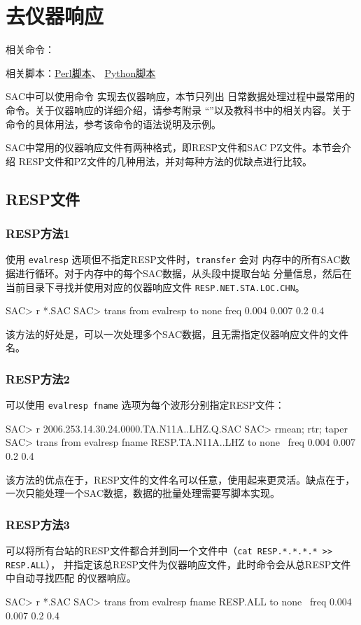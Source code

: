 \section{去仪器响应}
\label{sec:instrument-response}
相关命令：

相关脚本：\hyperref[subsec:transfer-perl]{Perl脚本}、
          \hyperref[subsec:transfer-python]{Python脚本}

SAC中可以使用命令  实现去仪器响应，本节只列出
日常数据处理过程中最常用的命令。关于仪器响应的详细介绍，请参考附录
``''以及教科书中的相关内容。关于 
命令的具体用法，参考该命令的语法说明及示例。

SAC中常用的仪器响应文件有两种格式，即RESP文件和SAC PZ文件。本节会介绍
RESP文件和PZ文件的几种用法，并对每种方法的优缺点进行比较。

\subsection{RESP文件}

\subsubsection{RESP方法1}
使用 \texttt{evalresp} 选项但不指定RESP文件时，\texttt{transfer} 会对
内存中的所有SAC数据进行循环。对于内存中的每个SAC数据，从头段中提取台站
分量信息，然后在当前目录下寻找并使用对应的仪器响应文件
\texttt{RESP.NET.STA.LOC.CHN}。
\begin{SACCode}
SAC> r *.SAC
SAC> trans from evalresp to none freq 0.004 0.007 0.2 0.4
\end{SACCode}
该方法的好处是，可以一次处理多个SAC数据，且无需指定仪器响应文件的文件名。

\subsubsection{RESP方法2}
可以使用 \texttt{evalresp fname} 选项为每个波形分别指定RESP文件：
\begin{SACCode}
SAC> r 2006.253.14.30.24.0000.TA.N11A..LHZ.Q.SAC
SAC> rmean; rtr; taper
SAC> trans from evalresp fname RESP.TA.N11A..LHZ to none \
                                freq 0.004 0.007 0.2 0.4
\end{SACCode}
该方法的优点在于，RESP文件的文件名可以任意，使用起来更灵活。缺点在于，
一次只能处理一个SAC数据，数据的批量处理需要写脚本实现。

\subsubsection{RESP方法3}
可以将所有台站的RESP文件都合并到同一个文件中（\texttt{cat RESP.*.*.*.* >> RESP.ALL}），
并指定该总RESP文件为仪器响应文件，此时命令会从总RESP文件中自动寻找匹配
的仪器响应。
\begin{SACCode}
SAC> r *.SAC
SAC> trans from evalresp fname RESP.ALL to none \
                            freq 0.004 0.007 0.2 0.4
\end{SACCode}

